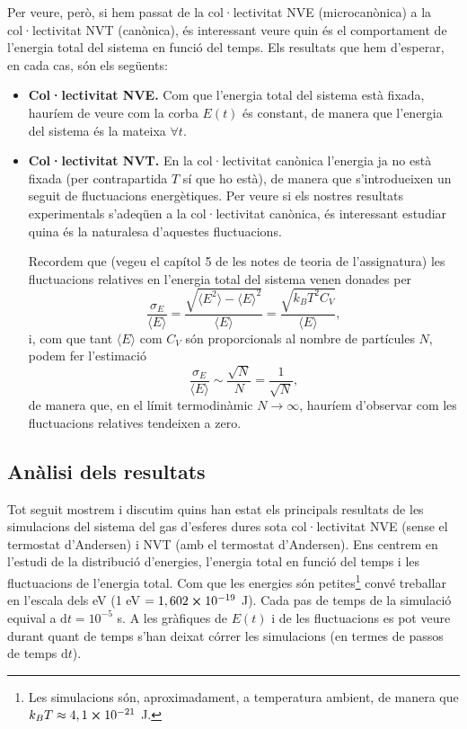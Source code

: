 \documentclass[a4paper,10.5pt]{report}
\begin{document}
Per veure, però, si hem passat de la col·lectivitat NVE (microcanònica) a la col·lectivitat NVT (canònica), és interessant veure quin és el comportament de l'energia total del sistema en funció del temps. Els resultats que hem d'esperar, en cada cas, són els següents:
\begin{itemize}
	\item \textbf{Col·lectivitat NVE.} Com que l'energia total del sistema està fixada, hauríem de veure com la corba $E(t)$ és constant, de manera que l'energia del sistema és la mateixa $\forall t$.
	\item \textbf{Col·lectivitat NVT.} En la col·lectivitat canònica l'energia ja no està fixada (per contrapartida $T$ sí que ho està), de manera que s'introdueixen un seguit de fluctuacions energètiques. Per veure si els nostres resultats experimentals s'adeqüen a la col·lectivitat canònica, és interessant estudiar quina és la naturalesa d'aquestes fluctuacions. 
	
	Recordem que (vegeu el capítol 5 de les notes de teoria de l'assignatura\cite{ref4}) les fluctuacions relatives en l'energia total del sistema venen donades per
	\begin{equation}
		\frac{\sigma_E}{\langle E \rangle} = \frac{\sqrt{\langle E^2 \rangle - \langle E \rangle^2}}{\langle E \rangle} = \frac{\sqrt{k_BT^2 C_V}}{\langle E \rangle}, \label{eq:1.19}
	\end{equation}
	i, com que tant $\langle E \rangle$ com $C_V$ són proporcionals al nombre de partícules $N$, podem fer l'estimació
	\begin{equation}
		\frac{\sigma_E}{\langle E \rangle} \sim \frac{\sqrt{N}}{N} = \frac{1}{\sqrt{N}},
	\end{equation}
	de manera que, en el límit termodinàmic $N \rightarrow \infty$, hauríem d'observar com les fluctuacions relatives tendeixen a zero.
\end{itemize}

\subsection{Anàlisi dels resultats}
Tot seguit mostrem i discutim quins han estat els principals resultats de les simulacions del sistema del gas d'esferes dures sota col·lectivitat NVE (sense el termostat d'Andersen) i NVT (amb el termostat d'Andersen). Ens centrem en l'estudi de la distribució d'energies, l'energia total en funció del temps i les fluctuacions de l'energia total. Com que les energies són petites\footnote{Les simulacions són, aproximadament, a temperatura ambient, de manera que $k_BT \approx 4,1 \cross 10^{-21}$ J.} convé treballar en l'escala dels eV (1 eV $= 1,602\cross 10^{-19}$ J). Cada pas de temps de la simulació equival a $\mathrm{d}t = 10^{-5}$ s. A les gràfiques de $E(t)$ i de les fluctuacions es pot veure durant quant de temps s'han deixat córrer les simulacions (en termes de passos de temps $\mathrm{d}t$).
\end{document}
